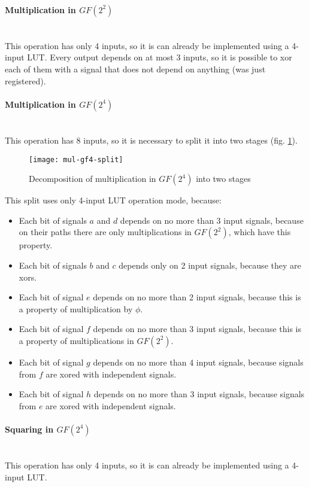 \paragraph{Multiplication in $GF(2^2)$}\mbox{}\\
This operation has only 4 inputs, so it is can already be implemented using a 4-input LUT. Every output depends on at most 3 inputs, so it is possible to xor each of them with a signal that does not depend on anything (was just registered).

\paragraph{Multiplication in $GF(2^4)$}\mbox{}\\
This operation has 8 inputs, so it is necessary to split it into two stages (fig. \ref{fig:mul-gf4-split}).

\begin{figure}[!h]
\centering
\texttt{[image: mul-gf4-split]}
\caption{Decomposition of multiplication in $GF(2^4)$ into two stages}
\label{fig:mul-gf4-split}
\end{figure}

This split uses only 4-input LUT operation mode, because:
\begin{itemize}[nolistsep]
\item Each bit of signals $a$ and $d$ depends on no more than 3 input signals, because on their paths there are only multiplications in $GF(2^2)$, which have this property. 
\item Each bit of signals $b$ and $c$ depends only on 2 input signals, because they are xors.
\item Each bit of signal $e$ depends on no more than 2 input signals, because this is a property of multiplication by $\phi$.
\item Each bit of signal $f$ depends on no more than 3 input signals, because this is a property of multiplications in $GF(2^2)$.
\item Each bit of signal $g$ depends on no more than 4 input signals, because signals from $f$ are xored with independent signals.
\item Each bit of signal $h$ depends on no more than 3 input signals, because signals from $e$ are xored with independent signals.
\end{itemize}


\paragraph{Squaring in $GF(2^4)$}\mbox{}\\
This operation has only 4 inputs, so it is can already be implemented using a 4-input LUT.


